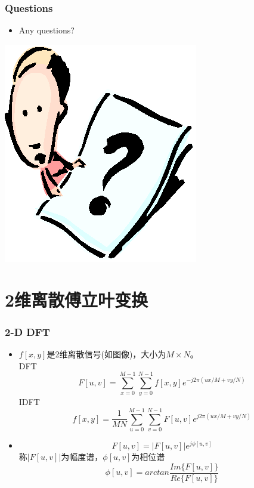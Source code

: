 \documentclass[CJKutf8,dvipsnames,table]{beamer}
\begin{document}
\begin{CJK*}{UTF8}{song}
  \begin{frame}
    \frametitle{Questions}
    \begin{itemize}
    \item Any questions?
    \end{itemize}
    \begin{center}
      \includegraphics[scale=.5]{question}
    \end{center}
  \end{frame}  
  
  \section{2维离散傅立叶变换}

  \begin{frame}
    \frametitle{2-D DFT}
    \begin{itemize}
    \item $f[x, y]$是2维离散信号(如图像)，大小为$M \times N$。\\
    DFT
    \[
    	F[u, v] = \sum_{x=0}^{M-1} \sum_{y=0}^{N-1} f[x, y] e^{-j2\pi (ux/M+vy/N)}
    \]
    IDFT
    \[
    	f[x, y] = \frac{1}{MN}\sum_{u=0}^{M-1} \sum_{v=0}^{N-1} F[u, v] e^{j2\pi (ux/M+vy/N)}    
    \]
    
    \item
    \[
    	F[u, v] = |F[u, v]|e^{j\phi[u, v]}
    \]
    称$|F[u, v]|$为幅度谱，$\phi[u,v]$为相位谱
    \[
    	\phi[u, v] = arctan\frac{\mathit{Im}\{F[u, v]\}}{\mathit{Re}\{F[u, v]\}}
    \]
    \end{itemize}
    
  \end{frame}  
  

\end{CJK*}
\end{document}
